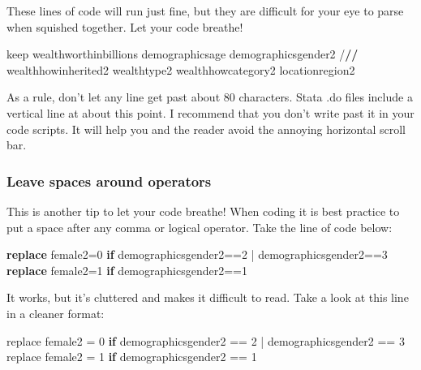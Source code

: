 \documentclass[
]{book}
\newenvironment{Shaded}{\begin{snugshade}}{\end{snugshade}}
\newcommand{\ControlFlowTok}[1]{\textcolor[rgb]{0.13,0.29,0.53}{\textbf{#1}}}
\newcommand{\DecValTok}[1]{\textcolor[rgb]{0.00,0.00,0.81}{#1}}
\newcommand{\ErrorTok}[1]{\textcolor[rgb]{0.64,0.00,0.00}{\textbf{#1}}}
\newcommand{\KeywordTok}[1]{\textcolor[rgb]{0.13,0.29,0.53}{\textbf{#1}}}
\newcommand{\NormalTok}[1]{#1}
\newcommand{\OtherTok}[1]{\textcolor[rgb]{0.56,0.35,0.01}{#1}}
\newcommand{\SpecialCharTok}[1]{\textcolor[rgb]{0.00,0.00,0.00}{#1}}
\begin{document}
These lines of code will run just fine, but they are difficult for your eye to parse when squished together. Let your code breathe!

\begin{Shaded}
\begin{Highlighting}[]
\NormalTok{keep wealthworthinbillions demographicsage demographicsgender2 }\SpecialCharTok{/}\ErrorTok{//}
\NormalTok{  wealthhowinherited2 wealthtype2 wealthhowcategory2 locationregion2}
\end{Highlighting}
\end{Shaded}

As a rule, don't let any line get past about 80 characters. Stata .do files include a
vertical line at about this point. I recommend that you don't write past it in
your code scripts. It will help you and the reader avoid the annoying horizontal scroll bar.

\hypertarget{leave-spaces-around-operators}{%
\subsubsection*{Leave spaces around operators}\label{leave-spaces-around-operators}}

This is another tip to let your code breathe! When coding it is best practice to
put a space after any comma or logical operator. Take the line of code below:

\begin{Shaded}
\begin{Highlighting}[]
\KeywordTok{replace}\NormalTok{ female2=0 }\KeywordTok{if}\NormalTok{ demographicsgender2==2 | demographicsgender2==3}
\KeywordTok{replace}\NormalTok{ female2=1 }\KeywordTok{if}\NormalTok{ demographicsgender2==1}
\end{Highlighting}
\end{Shaded}

It works, but it's cluttered and makes it difficult to read. Take a look at this
line in a cleaner format:

\begin{Shaded}
\begin{Highlighting}[]
\NormalTok{replace female2 }\OtherTok{=} \DecValTok{0} \ControlFlowTok{if}\NormalTok{ demographicsgender2 }\SpecialCharTok{==} \DecValTok{2} \SpecialCharTok{|}\NormalTok{ demographicsgender2 }\SpecialCharTok{==} \DecValTok{3}
\NormalTok{replace female2 }\OtherTok{=} \DecValTok{1} \ControlFlowTok{if}\NormalTok{ demographicsgender2 }\SpecialCharTok{==} \DecValTok{1}
\end{Highlighting}
\end{Shaded}
\end{document}
